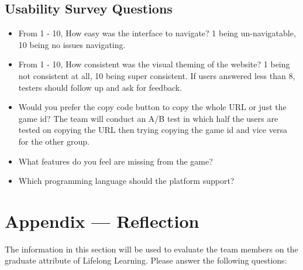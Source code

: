\documentclass[12pt, titlepage]{article}
\begin{document}
\subsection{Usability Survey Questions}\label{UsabilitySurveyQuestions} 

\begin{itemize}
    \item From 1 - 10, How easy was the interface to navigate? 
    1 being un-navigatable, 10 being no issues navigating.

    \item From 1 - 10, How consistent was the visual theming of the website? 1 being not consistent at all, 10 being super consistent. If users answered less than 8, testers should follow up and ask for feedback.

    \item Would you prefer the copy code button to copy the whole URL or just the game id? The team will conduct an A/B test in which half the users are tested on copying the URL then trying copying the game id and vice versa for the other group.

    \item What features do you feel are missing from the game?

    \item Which programming language should the platform support?


\end{itemize}

\newpage{}
\section*{Appendix --- Reflection}

The information in this section will be used to evaluate the team members on the
graduate attribute of Lifelong Learning.  Please answer the following questions:
\end{document}
